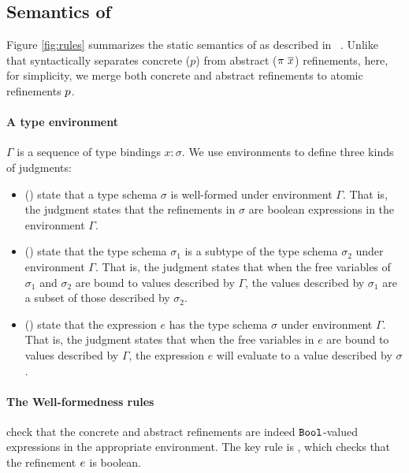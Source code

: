 \subsection{Semantics of \corelan}\label{sec:semantics-corelan}



Figure \ref{fig:rules} summarizes the static semantics of \corelan
as described in ~\citep{vazou13}.
Unlike~\citep{vazou13} that syntactically separates concrete ($p$)
from abstract (${\pi \ \overline{x}}$) refinements,
here, for simplicity, we merge both concrete and abstract refinements to
atomic refinements $p$.

\paragraph{A type environment} $\Gamma$ is a sequence of type bindings $x:\sigma$.
We use environments to define three kinds of judgments:

\begin{itemize}
\item{ (\isWellFormed{\Gamma}{\sigma})}
state that a type schema $\sigma$ is well-formed under environment
$\Gamma$. That is, the judgment states that the refinements in $\sigma$
are boolean expressions in the environment $\Gamma$.

\item{ ()}
state that the type schema $\sigma_1$ is a subtype of the type schema
$\sigma_2$ under environment $\Gamma$. That is, the judgment states that
when the free variables of $\sigma_1$ and $\sigma_2$ are bound to values
described by $\Gamma$, the values described by $\sigma_1$ are a subset
of those described by $\sigma_2$.

\item{ ()} state that
the expression $e$ has the type schema $\sigma$ under environment $\Gamma$.
That is, the judgment states that when the free variables in $e$ are bound
to values described by $\Gamma$, the expression $e$ will evaluate to a value
described by $\sigma$.
\end{itemize}

\paragraph{The Well-formedness rules}
check that the concrete and abstract refinements are indeed $\texttt{Bool}$-valued
expressions in the appropriate environment. The key rule is \wtBase, which
checks that the refinement $e$ is boolean.

